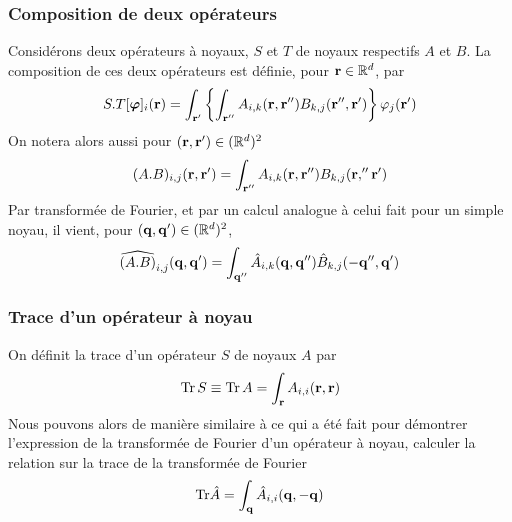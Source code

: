 \documentclass[10.5pt]{article}
\begin{document}
\begin{multicols}{2}
\vspace*{11pt}

\subsubsection{Composition de deux opérateurs}

Considérons deux opérateurs à noyaux, $S$ et $T$ de noyaux respectifs $A$ et $B$. La composition de ces deux opérateurs est définie, pour ${\bf r} \in \mathbb{R}^d$, par
\begin{equation}
 	S . T [\boldsymbol{ \varphi}]_i ({\bf r}) = \int_{{\bf r}'}  \left\{ \int_{{\bf r}''} A_{i,k}({\bf r}, {\bf r}'')B_{k,j}({\bf r}'', {\bf r}') \right\} \varphi_j({\bf r}')
\end{equation}
On notera alors aussi pour $({\bf r}, {\bf r}') \in (\mathbb{R}^d)^2 $
\begin{equation}
   (A . B)_{i,j} ({\bf r}, {\bf r}') = \int_{{\bf r}''} A_{i,k}({\bf r}, {\bf r}'')B_{k,j}({\bf r},'' {\bf r}') 
\end{equation}
Par transformée de Fourier, et par un calcul analogue à celui fait pour un simple noyau, il vient, pour $({\bf q}, {\bf q}') \in (\mathbb{R}^d)^2$,
\begin{equation}
	\widehat{(A . B)}_{i,j}({\bf q}, {\bf q}') =\int_{{\bf q}''} \hat{A}_{i,k}({\bf q}, {\bf q}'')\hat{B}_{k,j}(-{\bf q}'', {\bf q}') 
\end{equation}



\vspace*{11pt}

\subsubsection{Trace d'un opérateur à noyau}

On définit la trace d'un opérateur $S$ de noyaux $A$ par
\begin{equation}
  \text{Tr}\, S \equiv \text{Tr} \, A = \int_{{\bf r}} A_{i,i}({\bf r},{\bf r}) 
\end{equation}
Nous pouvons alors de manière similaire à ce qui a été fait pour démontrer l'expression de la transformée de Fourier d'un opérateur à noyau, calculer la relation sur la trace de la transformée de Fourier
\begin{equation}
  \text{Tr} \hat{A} =  \int_{{\bf q}} \hat{A}_{i,i}({\bf q},-{\bf q}) 
 \end{equation}



\vspace*{11pt}




\end{multicols}
\end{document}
